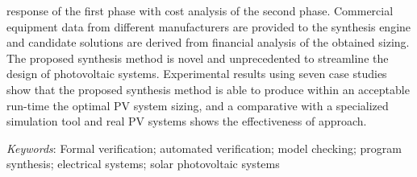 response of the first phase with cost analysis of the second phase. Commercial equipment data from different manufacturers are provided to the synthesis engine and candidate solutions are derived from financial analysis of the obtained sizing. The proposed synthesis method is novel and unprecedented to streamline the design of photovoltaic systems. Experimental results using seven case studies show that the proposed synthesis method is able to produce within an acceptable run-time the optimal PV system sizing, and a comparative with a specialized simulation tool and real PV systems shows the effectiveness of approach.



\textit{Keywords}: Formal verification; automated verification; model checking; program synthesis; electrical systems; solar photovoltaic systems
